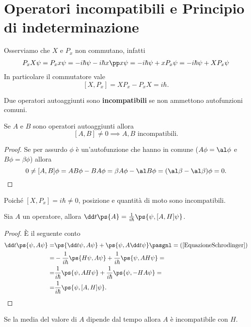 \section{Operatori incompatibili e Principio di indeterminazione}

\begin{remark}
Osserviamo che $X$ e $P_x$ non commutano, infatti
\begin{align*}
P_xX\psi=P_xx\psi=-i\hbar \psi -i\hbar x\pp x\psi=-i\hbar \psi+xP_x\psi=-i\hbar \psi+XP_x\psi
\end{align*}
In particolare il commutatore vale
\[[X,P_x]=XP_x-P_xX=i\hbar.\]
\end{remark}

\begin{definition}
Due operatori autoaggiunti sono \textbf{incompatibili} se non ammettono autofunzioni comuni.
\end{definition}

\begin{proposition}
Se $A$ e $B$ sono operatori autoaggiunti allora 
\[[A,B]\neq 0\implies A,B \text{ incompatibili.}\]
\end{proposition}
\begin{proof}
Se per assurdo $\phi$ \`e un'autofunzione che hanno in comune ($A\phi=\al \phi$ e $B\phi=\beta\phi$) allora
\[0\neq [A,B]\phi=AB\phi-BA\phi=\beta A\phi-\al B\phi=(\al\beta-\al\beta)\phi=0.\]
\end{proof}

\begin{remark}
Poich\'e $[X,P_x]=i\hbar\neq 0$, posizione e quantit\`a di moto sono incompatibili.
\end{remark}



\begin{proposition}
Sia $A$ un operatore, allora
$\dd t{}\ps{A}=\frac1{i\hbar}\ps{\psi,[A,H]\psi}$.
\end{proposition}
\begin{proof}
\`E il seguente conto
\begin{align*}
\dd t{}\ps{\psi,A\psi}=&\ps{\dd t\psi,A\psi}+\ps{\psi,A\dd t\psi}\pasgnl={(\ref{EquazioneSchrodinger})}\\
=&-\frac1{i\hbar}\ps{H\psi,A\psi}+\frac1{i\hbar}\ps{\psi,AH\psi}=\\
=&\frac1{i\hbar}\ps{\psi,AH\psi}+\frac1{i\hbar}\ps{\psi,-HA\psi}=\\
=&\frac1{i\hbar}\ps{\psi,[A,H]\psi}.
\end{align*}
\end{proof}
\begin{corollary}
Se la media del valore di $A$ dipende dal tempo allora $A$ \`e incompatibile con $H$.
\end{corollary}


